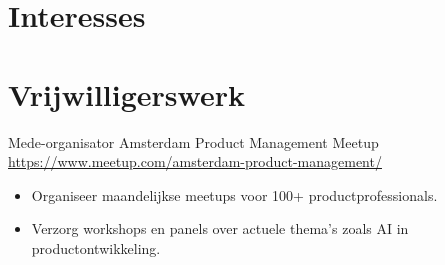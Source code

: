 \documentclass[a4paper, serif, 10pt]{moderncv}
\begin{document}
\section{Interesses}

\section{Vrijwilligerswerk}

        {Mede-organisator}
        {Amsterdam Product Management Meetup}
        {\url{https://www.meetup.com/amsterdam-product-management/}}
        {}
        {\begin{itemize}
\item Organiseer maandelijkse meetups voor 100+ productprofessionals.
\item Verzorg workshops en panels over actuele thema's zoals AI in productontwikkeling.
\end{itemize}}
\end{document}
